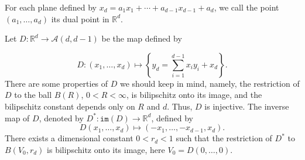 \documentclass[11pt]{article}
\newcommand{\1}{\mathbf{1}}
\begin{document}
For each plane defined by $x_d=a_1x_1+\cdots+a_{d-1}x_{d-1}+a_d$, we call the point $(a_1, \ldots, a_d)$ its dual point in $\mathbb{R}^d$.

Let $D\colon \mathbb{R}^d\to \mathcal{A}(d, d-1)$ be the map defined by

\[D \colon (x_1,\ldots,x_d) \mapsto \left\lbrace y_d=\sum_{i=1}^{d-1} x_iy_i+x_d\right\rbrace.\]
There are some properties of $D$ we should keep in mind, namely, the restriction of $D$ to the ball $B(R)$, $0<R<\infty$, is bilipschitz onto its image, and the bilipschitz constant depends only on $R$ and $d$. Thus, $D$ is injective. The inverse map of $D$, denoted by $D^*\colon \mathtt{im}(D)\to \mathbb{R}^d$, defined by
\[D(x_1, \ldots, x_d)\mapsto (-x_1, \ldots, -x_{d-1}, x_d).\]
There exists a dimensional constant $0<r_d<1$ such that the restriction of $D^*$ to $B(V_0, r_d)$ is bilipschitz onto its image, here $V_0=D(0, \ldots, 0)$.
\end{document}
